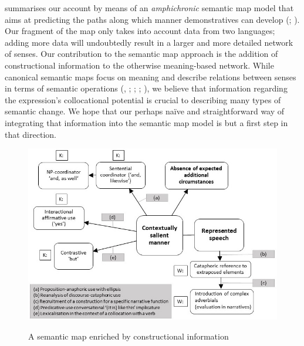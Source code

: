 \documentclass[output=paper,colorlinks,citecolor=brown]{langscibook}
\begin{document}
 summarises our account by means of an \textit{amphichronic} semantic map model that aims at predicting the paths along which manner demonstratives can develop (\citealt{Jurafsky1996}; \citealt{Nikitina2019Diminutives}). Our fragment of the map only takes into account data from two languages; adding more data will undoubtedly result in a larger and more detailed network of senses. Our contribution to the semantic map approach is the addition of constructional information to the otherwise meaning-based network. While canonical semantic maps focus on meaning and describe relations between senses in terms of semantic operations (\citealt{Lakoff1987}, \citealt{Janda1990}; \citealt{Jurafsky1996}; \citealt{Lewandowska-Tomaszczyk2007}; \citealt{GeorgakopoulosPolis2018}), we believe that information regarding the expression’s collocational potential is crucial to describing many types of semantic change. We hope that our perhaps naïve and straightforward way of integrating that information into the semantic map model is but a first step in that direction.

\begin{figure}
\caption{A semantic map enriched by constructional information}
\includegraphics[width=\textwidth]{figures/3_Figure1.jpg}
\label{fig:nikitina:1}
\end{figure}
\end{document}
